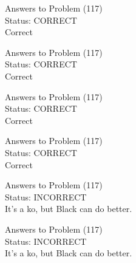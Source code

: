 \documentclass[11pt]{article}
\begin{document}
\begin{minipage}[t]{0.5\textwidth}
  {\centering
  
  Answers to Problem (117)\\
  Status: CORRECT\\
  Correct\\
  }
\end{minipage}
\begin{minipage}[t]{0.5\textwidth}
  {\centering
  
  Answers to Problem (117)\\
  Status: CORRECT\\
  Correct\\
  }
\end{minipage}
\begin{minipage}[t]{0.5\textwidth}
  {\centering
  
  Answers to Problem (117)\\
  Status: CORRECT\\
  Correct\\
  }
\end{minipage}
\begin{minipage}[t]{0.5\textwidth}
  {\centering
  
  Answers to Problem (117)\\
  Status: CORRECT\\
  Correct\\
  }
\end{minipage}
\begin{minipage}[t]{0.5\textwidth}
  {\centering
  
  Answers to Problem (117)\\
  Status: INCORRECT\\
  It's a ko, but Black can do better.\\
  }
\end{minipage}
\begin{minipage}[t]{0.5\textwidth}
  {\centering
  
  Answers to Problem (117)\\
  Status: INCORRECT\\
  It's a ko, but Black can do better.\\
  }
\end{minipage}
\end{document}
